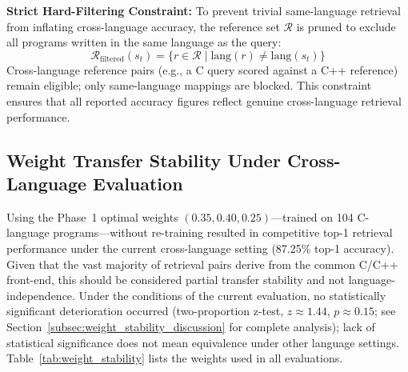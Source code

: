 \textbf{Strict Hard-Filtering Constraint:} To prevent trivial same-language retrieval from inflating cross-language accuracy, the reference set $\mathcal{R}$ is pruned to exclude all programs written in the same language as the query:
\begin{equation}
    \mathcal{R}_{\text{filtered}}(s_t) = \{r \in \mathcal{R} \mid \text{lang}(r) \neq \text{lang}(s_t)\}
\end{equation}
Cross-language reference pairs (e.g., a C query scored against a C++ reference) remain eligible; only same-language mappings are blocked. This constraint ensures that all reported accuracy figures reflect genuine cross-language retrieval performance.

\subsection{Weight Transfer Stability Under Cross-Language Evaluation}
\label{subsec:weight_stability}

Using the Phase~1 optimal weights $(0.35, 0.40, 0.25)$---trained on 104 C-language programs---without re-training resulted in competitive top-1 retrieval performance under the current cross-language setting (87.25\% top-1 accuracy). Given that the vast majority of retrieval pairs derive from the common C/C++ front-end, this should be considered partial transfer stability and not language-independence. Under the conditions of the current evaluation, no statistically significant deterioration occurred (two-proportion z-test, $z \approx 1.44$, $p \approx 0.15$; see Section~\ref{subsec:weight_stability_discussion} for complete analysis); lack of statistical significance does not mean equivalence under other language settings. Table~\ref{tab:weight_stability} lists the weights used in all evaluations.


